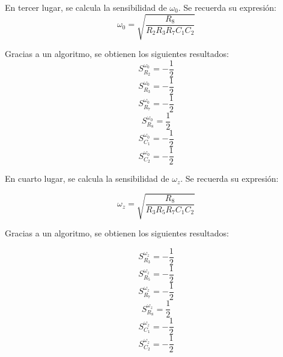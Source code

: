 En tercer lugar, se calcula la sensibilidad de $\omega_0$. Se recuerda su expresión:
\begin{displaymath}  \omega_0 = \sqrt{\frac{R_8}{R_2 R_3 R_7 C_1 C_2}}\end{displaymath}

Gracias a un algoritmo, se obtienen los siguientes resultados:
\begin{displaymath}  S^{\omega_0}_{R_2} = -\frac{1}{2}\end{displaymath}
\begin{displaymath}  S^{\omega_0}_{R_3} = -\frac{1}{2}\end{displaymath}
\begin{displaymath}  S^{\omega_0}_{R_7} = -\frac{1}{2}\end{displaymath}
\begin{displaymath}  S^{\omega_0}_{R_8} = \frac{1}{2}\end{displaymath}
\begin{displaymath}  S^{\omega_0}_{C_1} = -\frac{1}{2}\end{displaymath}
\begin{displaymath}  S^{\omega_0}_{C_2} = -\frac{1}{2}\end{displaymath}

En cuarto lugar, se calcula la sensibilidad de $\omega_z$. Se recuerda su expresión:

\begin{displaymath}  \omega_z = \sqrt{\frac{R_8}{R_3 R_5 R_7 C_1 C_2}}\end{displaymath}

Gracias a un algoritmo, se obtienen los siguientes resultados:

\begin{displaymath}  S^{\omega_z}_{R_3} = -\frac{1}{2}\end{displaymath}
\begin{displaymath}  S^{\omega_z}_{R_5} = -\frac{1}{2}\end{displaymath}
\begin{displaymath}  S^{\omega_z}_{R_7} = -\frac{1}{2}\end{displaymath}
\begin{displaymath}  S^{\omega_z}_{R_8} = \frac{1}{2}\end{displaymath}
\begin{displaymath}  S^{\omega_z}_{C_1} = -\frac{1}{2}\end{displaymath}
\begin{displaymath}  S^{\omega_z}_{C_2} = -\frac{1}{2}\end{displaymath}

